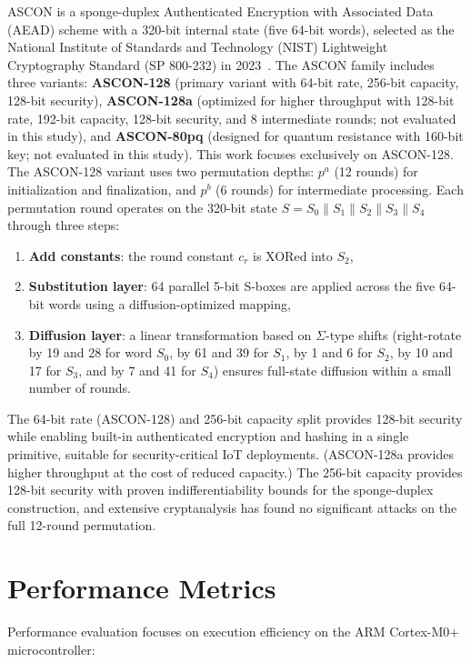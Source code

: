 \documentclass[12pt]{report}
\begin{document}
ASCON is a sponge-duplex Authenticated Encryption with Associated Data (AEAD) scheme with a 320-bit internal state
(five 64-bit words), selected as the National Institute of Standards and Technology (NIST) Lightweight Cryptography Standard (SP 800-232)
in 2023~\cite{dobraunig2016ascon,nist2025ascon}. The ASCON family includes three variants: \textbf{ASCON-128} (primary variant with 64-bit rate, 256-bit capacity, 128-bit security), \textbf{ASCON-128a} (optimized for higher throughput with 128-bit rate, 192-bit capacity, 128-bit security, and 8 intermediate rounds; not evaluated in this study), and \textbf{ASCON-80pq} (designed for quantum resistance with 160-bit key; not evaluated in this study). This work focuses exclusively on ASCON-128. The ASCON-128 variant uses two permutation depths:
$p^a$ (12 rounds) for initialization and finalization, and $p^b$ (6 rounds) for intermediate
processing. Each permutation round operates on the 320-bit state $S = S_0 \| S_1 \| S_2 \| S_3 \| S_4$
through three steps:
\begin{enumerate}
    \item \textbf{Add constants}: the round constant $c_r$ is XORed into $S_2$,
    \item \textbf{Substitution layer}: 64 parallel 5-bit S-boxes are applied across the five
          64-bit words using a diffusion-optimized mapping,
    \item \textbf{Diffusion layer}: a linear transformation based on
          $\Sigma$-type shifts (right-rotate by 19 and 28 for word $S_0$, by 61 and 39 for
          $S_1$, by 1 and 6 for $S_2$, by 10 and 17 for $S_3$, and by 7 and 41 for $S_4$)
          ensures full-state diffusion within a small number of rounds.
\end{enumerate}
The 64-bit rate (ASCON-128) and 256-bit capacity split provides 128-bit security while
enabling built-in authenticated encryption and hashing in a single primitive,
suitable for security-critical IoT deployments. (ASCON-128a provides higher throughput at the cost of reduced capacity.)
The 256-bit capacity provides 128-bit security with proven
indifferentiability bounds for the sponge-duplex construction, and
extensive cryptanalysis has found no significant attacks on the full
12-round permutation.

\section{Performance Metrics}

Performance evaluation focuses on execution efficiency on the ARM Cortex-M0+ microcontroller:
\end{document}
